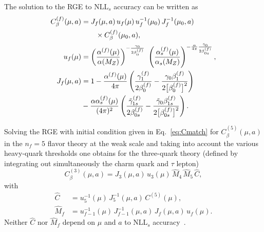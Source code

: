 \documentclass[prl,twocolumn,twoside,preprintnumbers,superscriptaddress,nofootinbib,letterpaper]{revtex4-1}
\newcommand{\beq}{\begin{equation}}
\newcommand{\eeq}{\end{equation}}
\begin{document}
The solution to the RGE to $\text{NLL}_s$  accuracy can be written as~\cite{Gorbahn:2025ssv}
\begin{align}
C_\beta^{(f)} (\mu, a) &=  J_f (\mu, a) \, u_f (\mu) \, u_f^{-1} (\mu_0) \, J_f^{-1} (\mu_0,a) \notag\\
&\qquad\times C_\beta^{(f)} (\mu_0, a),\notag\\
u_f (\mu) &=
\left(\frac{\alpha^{(f)}(\mu)}{\alpha (M_Z)} \right)^{- \frac{\gamma_0}{2 \beta_0^{(f)}}}  \
\left(\frac{\alpha_s^{(f)}(\mu)}{\alpha_s (M_Z)} \right)^{- \frac{\alpha}{4 \pi} \frac{\tilde \gamma_{0}}{2 \beta_{0s}^{(f)}   }},
\nonumber \\
J_f (\mu,a) &=
1 -\frac{\alpha^{(f)} (\mu)}{4 \pi}
\left(  \frac{\gamma_1^{(f)}}{2 \beta_0^{(f)}}
- \frac{\gamma_0 \beta_1^{(f)}
}{2 \big[\beta_0^{(f)}\big]^2}
 \right)
 \nonumber \\
 &- \frac{\alpha \alpha_s^{(f)} (\mu)}{(4 \pi)^2}
\left(  \frac{\tilde \gamma_{1s}^{(f)}}{2 \beta_{0s}^{(f)}}
- \frac{ \tilde \gamma_0 \beta_{1s}^{(f)}
}{2 \big[\beta_{0s}^{(f)}\big]^2}
 \right).
\end{align}

Solving the RGE with initial condition given in Eq.~\eqref{eq:Cmatch} for $C_\beta^{(5)} (\mu,a)$ in the $n_f=5$ flavor theory
at the weak scale  and taking into account the various heavy-quark thresholds one obtains for the three-quark theory
(defined by integrating out simultaneously the charm quark and $\tau$ lepton)~\cite{Gorbahn:2025ssv}
\beq
C_\beta^{(3)} (\mu, a) =  J_3 (\mu, a) \, u_3 (\mu)  \, \hat M_4 \, \hat M_5 \, \hat C,
\eeq
with
\begin{align}
\hat C &= u_5^{-1} (\mu) \, J_5^{-1} (\mu, a)  \, C^{(5)} (\mu),
\nonumber \\
\hat M_f &= u_{f-1}^{-1} (\mu) \, J_{f-1}^{-1} (\mu, a)   \, J_{f}  (\mu, a)  \, u_f (\mu).
\end{align}
Neither $\hat C$ nor $\hat M_f$  depend on $\mu$ and $a$ to $\text{NLL}_s$ accuracy~\cite{Gorbahn:2025ssv}.
\end{document}
